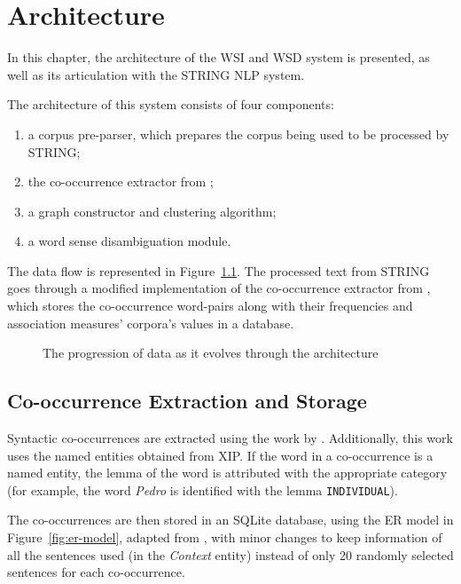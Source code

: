 \chapter{Architecture}
\label{ch:architecture}

In this chapter, the architecture of the \ac{WSI} and \ac{WSD} system is 
presented, as well as its 
articulation with the \ac{STRING} \ac{NLP} system.

The architecture of this system consists of four components:

\begin{enumerate}
  \item a corpus pre-parser, which prepares the corpus being used to be
processed by \ac{STRING};
  \item the co-occurrence extractor from \citet{correia2015syntax};
  \item a graph constructor and clustering algorithm;
  \item a word sense disambiguation module.
\end{enumerate}

The data flow is represented in Figure~\ref{fig:data-progression}. The 
processed text from \ac{STRING} 
goes through a modified implementation of the co-occurrence extractor from 
\citet{correia2015syntax}, which stores the co-occurrence word-pairs along with 
their frequencies and association measures' corpora's values in a database.

\begin{figure}[ht]
 \caption{The progression of data as it evolves through the architecture}
 \label{fig:data-progression}
 \centering
 
\end{figure}

\section{Co-occurrence Extraction and Storage}

Syntactic co-occurrences are extracted using the work by
\citet{correia2015syntax}. Additionally, this work uses the named entities
obtained from \ac{XIP}. If the word in a co-occurrence is a named entity, the
lemma of the word is attributed with the appropriate category (for example, the
word \emph{Pedro} is identified with the lemma \texttt{INDIVIDUAL}).

The co-occurrences are then stored in an SQLite database, using the \ac{ER} model in
Figure~\ref{fig:er-model}, adapted from \citet{correia2015syntax}, with minor 
changes to keep information of all the sentences used (in the \emph{Context}
entity) instead of only 20 randomly selected sentences for each co-occurrence.

